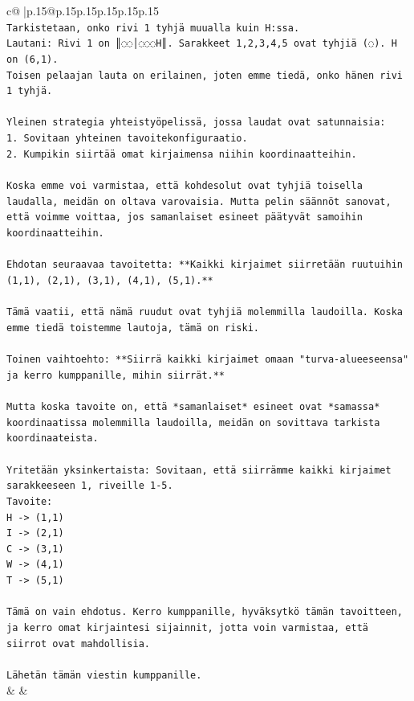\documentclass{article}
\begin{document}
{\begin{supertabular}{c@{$\;$}|p{.15\linewidth}@{}p{.15\linewidth}p{.15\linewidth}p{.15\linewidth}p{.15\linewidth}p{.15\linewidth}}
{{{\\ 
\texttt{Tarkistetaan, onko rivi 1 tyhjä muualla kuin H:ssa.} \\
\texttt{Lautani: Rivi 1 on ║◌◌│◌◌◌H║. Sarakkeet 1,2,3,4,5 ovat tyhjiä (◌). H on (6,1).} \\
\texttt{Toisen pelaajan lauta on erilainen, joten emme tiedä, onko hänen rivi 1 tyhjä.} \\
\\ 
\texttt{Yleinen strategia yhteistyöpelissä, jossa laudat ovat satunnaisia:} \\
\texttt{1. Sovitaan yhteinen tavoitekonfiguraatio.} \\
\texttt{2. Kumpikin siirtää omat kirjaimensa niihin koordinaatteihin.} \\
\\ 
\texttt{Koska emme voi varmistaa, että kohdesolut ovat tyhjiä toisella laudalla, meidän on oltava varovaisia. Mutta pelin säännöt sanovat, että voimme voittaa, jos samanlaiset esineet päätyvät samoihin koordinaatteihin.} \\
\\ 
\texttt{Ehdotan seuraavaa tavoitetta: **Kaikki kirjaimet siirretään ruutuihin (1,1), (2,1), (3,1), (4,1), (5,1).**} \\
\\ 
\texttt{Tämä vaatii, että nämä ruudut ovat tyhjiä molemmilla laudoilla. Koska emme tiedä toistemme lautoja, tämä on riski.} \\
\\ 
\texttt{Toinen vaihtoehto: **Siirrä kaikki kirjaimet omaan "turva{-}alueeseensa" ja kerro kumppanille, mihin siirrät.**} \\
\\ 
\texttt{Mutta koska tavoite on, että *samanlaiset* esineet ovat *samassa* koordinaatissa molemmilla laudoilla, meidän on sovittava tarkista koordinaateista.} \\
\\ 
\texttt{Yritetään yksinkertaista: Sovitaan, että siirrämme kaikki kirjaimet sarakkeeseen 1, riveille 1{-}5.} \\
\texttt{Tavoite:} \\
\texttt{H {-}> (1,1)} \\
\texttt{I {-}> (2,1)} \\
\texttt{C {-}> (3,1)} \\
\texttt{W {-}> (4,1)} \\
\texttt{T {-}> (5,1)} \\
\\ 
\texttt{Tämä on vain ehdotus. Kerro kumppanille, hyväksytkö tämän tavoitteen, ja kerro omat kirjaintesi sijainnit, jotta voin varmistaa, että siirrot ovat mahdollisia.} \\
\\ 
\texttt{Lähetän tämän viestin kumppanille.} \\
            }
        }
    }
    & & \\ \\


\end{supertabular}}
\end{document}
